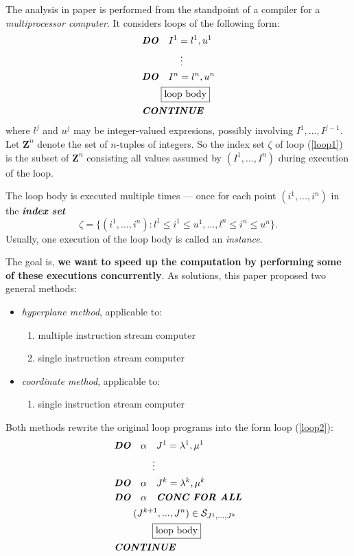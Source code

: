 The analysis in paper \cite{lamport1974parallel} is performed from the
standpoint of a compiler for a \textit{multiprocessor computer}. It considers
loops of the following form:
\begin{equation}
  \begin{aligned}
     &\textbf{\textit{DO}}\quad I^1 = l^1, u^1 \\
     &\qquad \qquad \vdots\\
     &\textbf{\textit{DO}}\quad I^n = l^n, u^n \\
     &\qquad \boxed{\text{loop body}} \\
     &\textbf{\textit{CONTINUE}} \label{loop1}
  \end{aligned}
\end{equation}
where $l^j$ and $u^j$ may be integer-valued expresions, possibly involving $I^{1},...,I^{j-1}$.
Let $\mathbf{Z}^n$ denote the set of $n$-tuples of integers. So the index set $\zeta$
of loop (\ref{loop1}) is the subset of $\mathbf{Z}^n$ consisting all values assumed
by $(I^1,...,I^n)$ during execution of the loop.

The loop body is executed multiple times --- once for each point $(i^1,...,i^n)$ in the
\textit{\textbf{index set}}
$$\zeta = \{ (i^1,...,i^n):l^1 \le i^1 \le u^1,...,l^n \le i^n \le u^n \}.$$
Usually, one execution of the loop body is called an \textit{instance}.

The goal is, \textbf{we want to speed up the computation by performing some of these
executions concurrently}. As solutions, this paper proposed two general methods:
\begin {itemize}
  \item [1)]
  \textit{hyperplane method}, applicable to:
  \begin{enumerate}
    \item multiple instruction stream computer
    \item single instruction stream computer
  \end{enumerate}
  \item [2)]
  \textit{coordinate method}, applicable to:
  \begin{enumerate}
    \item single instruction stream computer
  \end{enumerate}
\end {itemize}

Both methods rewrite the original loop programs into the form loop (\ref{loop2}):
\begin{equation}
  \begin{aligned}
    &\textbf{\textit{DO}}\quad \alpha \quad J^1 = \lambda^1, \mu^1 \\
    &\qquad \qquad \vdots\\
    &\textbf{\textit{DO}}\quad \alpha \quad J^k = \lambda^k, \mu^k \\
    &\textbf{\textit{DO}}\quad \alpha \quad \textbf{\textit{CONC FOR ALL}} \\
    &\qquad (J^{k+1},...,J^n) \in \mathcal{S}_{J^1,...,J^k} \\
    &\qquad \qquad \boxed{\text{loop body}} \\
    &\textbf{\textit{CONTINUE}} \label{loop2}
  \end{aligned}
\end{equation}